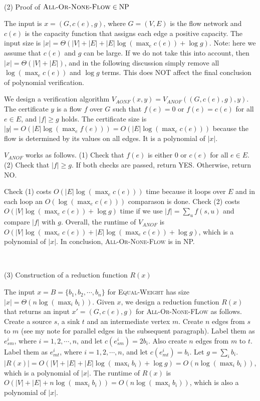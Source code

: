 \documentclass{article}
\begin{document}
~

\noindent(2) Proof of $\textsc{All-Or-None-Flow}\in\textup{NP}$

The input is $x=(G,c(e),g)$, where $G=(V,E)$ is the flow network and $c(e)$ is the capacity function that assigns each edge a positive capacity. The input size is $|x|=\Theta(|V|+|E|+|E|\log(\max_ec(e))+\log g)$. Note: here we assume that $c(e)$ and $g$ can be large. If we do not take this into account, then $|x|=\Theta(|V|+|E|)$, and in the following discussion simply remove all $\log(\max_ec(e))$ and $\log g$ terms. This does NOT affect the final conclusion of polynomial verification.

We design a verification algorithm $V_{AONF}(x,y)=V_{ANOF}((G,c(e),g),y)$. The certificate $y$ is a flow $f$ over $G$ such that $f(e)=0$ or $f(e)=c(e)$ for all $e\in E$, and $|f|\geqslant g$ holds. The certificate size is $|y|=O(|E|\log(\max_ef(e)))=O(|E|\log(\max_ec(e)))$ because the flow is determined by its values on all edges. It is a polynomial of $|x|$.

$V_{ANOF}$ works as follows. (1) Check that $f(e)$ is either 0 or $c(e)$ for all $e\in E$. (2) Check that $|f|\geqslant g$. If both checks are passed, return YES. Otherwise, return NO.

Check (1) costs $O(|E|\log(\max_ec(e)))$ time because it loops over $E$ and in each loop an $O(\log(\max_ec(e)))$ comparason is done. Check (2) costs $O(|V|\log(\max_ec(e))+\log g)$ time if we use $|f|=\sum_uf(s,u)$ and compare $|f|$ with $g$. Overall, the runtime of $V_{ANOF}$ is $O(|V|\log(\max_ec(e))+|E|\log(\max_ec(e))+\log g)$, which is a polynomial of $|x|$. In conclusion, \textsc{All-Or-None-Flow} is in NP.

~

\noindent(3) Construction of a reduction function $R(x)$

The input $x=B=\{b_1,b_2,\cdots,b_n\}$ for \textsc{Equal-Weight} has size $|x|=\Theta(n\log(\max_ib_i))$. Given $x$, we design a reduction function $R(x)$ that returns an input $x'=(G,c(e),g)$ for \textsc{All-Or-None-FLow} as follows. Create a source $s$, a sink $t$ and an intermediate vertex $m$. Create $n$ edges from $s$ to $m$ (see my note for parallel edges in the subsequent paragraph). Label them as $e_{sm}^i$, where $i=1,2,\cdots,n$, and let $c(e_{sm}^i)=2b_i$. Also create $n$ edges from $m$ to $t$. Label them as $e_{mt}^i$, where $i=1,2,\cdots,n$, and let $c(e_{mt}^i)=b_i$. Let $g=\sum_ib_i$. $|R(x)|=O(|V|+|E|+|E|\log(\max_ib_i)+\log g)=O(n\log(\max_ib_i))$, which is a polynomial of $|x|$. The runtime of $R(x)$ is $O(|V|+|E|+n\log(\max_ib_i))=O(n\log(\max_ib_i))$, which is also a polynomial of $|x|$.
\end{document}
